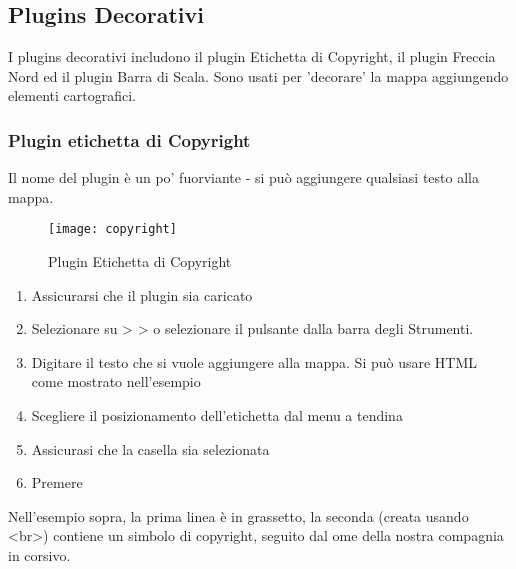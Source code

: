 
\subsection{Plugins Decorativi}


I plugins decorativi includono il plugin Etichetta di Copyright, il plugin Freccia Nord ed il plugin Barra di Scala. Sono usati per 'decorare' la mappa aggiungendo elementi cartografici.

\subsubsection{Plugin etichetta di Copyright}

Il nome del plugin è un po' fuorviante - si può aggiungere qualsiasi testo alla mappa.

\begin{figure}[ht]
   \begin{center}
   \caption{Plugin Etichetta di Copyright \nixcaption}\label{fig:copyright}\smallskip
   \texttt{[image: copyright]}
\end{center}  
\end{figure}

\begin{enumerate}
\item Assicurarsi che il plugin sia caricato
\item Selezionare su  >  >  o selezionare il pulsante  dalla barra degli Strumenti.
\item Digitare il testo che si vuole aggiungere alla mappa. Si può usare HTML come mostrato nell'esempio
\item Scegliere il posizionamento dell'etichetta dal menu a tendina 
\item Assicurasi che la casella  sia selezionata
\item Premere  
\end{enumerate}

Nell'esempio sopra, la prima linea è in grassetto, la seconda (creata usando 
\textless br\textgreater) contiene un simbolo di copyright, seguito dal ome della nostra compagnia in corsivo.

